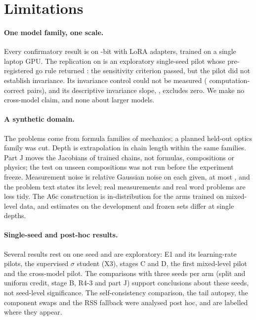 \section{Limitations}
\label{sec:limitations}

\paragraph{One model family, one scale.}
Every confirmatory result is on -bit  with LoRA adapters, trained on a single laptop
GPU.
The replication on  is an exploratory single-seed pilot whose pre-registered go rule returned
: the sensitivity criterion passed, but the pilot did not establish invariance. Its invariance control
could not be measured ( computation-correct pairs), and
its descriptive invariance slope, , excludes zero.
We make no cross-model claim, and none about larger models.

\paragraph{A synthetic domain.}
The problems come from  formula families of mechanics; a planned held-out optics family was cut.
Depth  is extrapolation in chain length within the same families.
Part J moves the Jacobians of trained chains, not formulas, compositions or physics; the test on unseen compositions
was not run before the experiment freeze.
Measurement noise is relative Gaussian noise on each given, at most , and the problem text states its
level; real measurements and real word problems are less tidy.
The A6c construction is in-distribution for the arms trained on mixed-level data, and estimates on the development
and frozen sets differ at single depths.

\paragraph{Single-seed and post-hoc results.}
Several results rest on one seed and are exploratory: E1 and its learning-rate pilots, the supervised $\sigma$ student
(X3), stages C and D, the first mixed-level pilot and the cross-model pilot.
The comparisons with three seeds per arm (split and uniform credit, stage B, R4-3 and part J) support conclusions about
these seeds, not seed-level significance.
The self-consistency comparison, the tail autopsy, the component swaps and the RSS fallback were analysed post hoc,
and are labelled where they appear.

